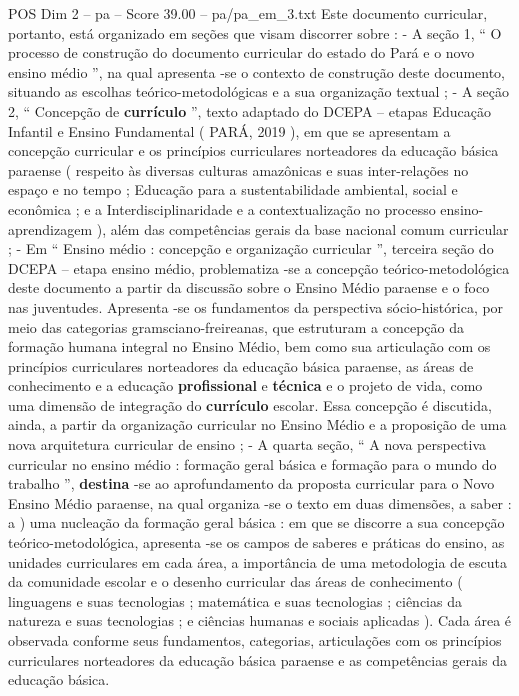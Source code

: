 \begin{textsample}{POS Dim 2 – pa – Score 39.00 – pa/pa\_em\_3.txt}
Este documento curricular, portanto, está organizado em seções que visam discorrer sobre : - A seção 1, “ O processo de construção do documento curricular do estado do Pará e o novo ensino médio ”, na qual apresenta -se o contexto de construção deste documento, situando as escolhas teórico-metodológicas e a sua organização textual ; - A seção 2, “ Concepção de \textbf{currículo} ”, texto adaptado do DCEPA – etapas Educação Infantil e Ensino Fundamental ( PARÁ, 2019 ), em que se apresentam a concepção curricular e os princípios curriculares norteadores da educação básica paraense ( respeito às diversas culturas amazônicas e suas inter-relações no espaço e no tempo ; Educação para a sustentabilidade ambiental, social e econômica ; e a Interdisciplinaridade e a contextualização no processo ensino-aprendizagem ), além das competências gerais da base nacional comum curricular ; - Em “ Ensino médio : concepção e organização curricular ”, terceira seção do DCEPA – etapa ensino médio, problematiza -se a concepção teórico-metodológica deste documento a partir da discussão sobre o Ensino Médio paraense e o foco nas juventudes.
Apresenta -se os fundamentos da perspectiva sócio-histórica, por meio das categorias gramsciano-freireanas, que estruturam a concepção da formação humana integral no Ensino Médio, bem como sua articulação com os princípios curriculares norteadores da educação básica paraense, as áreas de conhecimento e a educação \textbf{profissional} e \textbf{técnica} e o projeto de vida, como uma dimensão de integração do \textbf{currículo} escolar.
Essa concepção é discutida, ainda, a partir da organização curricular no Ensino Médio e a proposição de uma nova arquitetura curricular de ensino ; - A quarta seção, “ A nova perspectiva curricular no ensino médio : formação geral básica e formação para o mundo do trabalho ”, \textbf{destina} -se ao aprofundamento da proposta curricular para o Novo Ensino Médio paraense, na qual organiza -se o texto em duas dimensões, a saber : a ) uma nucleação da formação geral básica : em que se discorre a sua concepção teórico-metodológica, apresenta -se os campos de saberes e práticas do ensino, as unidades curriculares em cada área, a importância de uma metodologia de escuta da comunidade escolar e o desenho curricular das áreas de conhecimento ( linguagens e suas tecnologias ; matemática e suas tecnologias ; ciências da natureza e suas tecnologias ; e ciências humanas e sociais aplicadas ).
Cada área é observada conforme seus fundamentos, categorias, articulações com os princípios curriculares norteadores da educação básica paraense e as competências gerais da educação básica.

\end{textsample}
